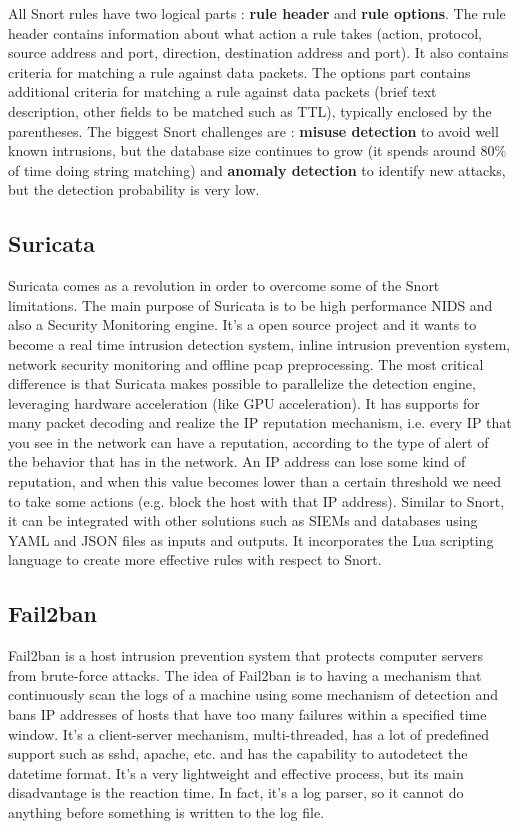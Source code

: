 \documentclass[11pt]{article}
\begin{document}
All Snort rules have two logical parts : \textbf{rule header} and \textbf{rule options}. The rule header contains information about what action a rule takes (action, protocol, source address and port, direction, destination address and port). It also contains criteria for matching a rule against data packets. The options part contains additional criteria for matching a rule against data packets (brief text description, other fields to be matched such as TTL), typically enclosed by the parentheses. The biggest Snort challenges are : \textbf{misuse detection} to avoid well known intrusions, but the database size continues to grow (it spends around $80\%$ of time doing string matching) and \textbf{anomaly detection} to identify new attacks, but the detection probability is very low.
\subsection{Suricata}
Suricata comes as a revolution in order to overcome some of the Snort limitations. The main purpose of Suricata is to be high performance NIDS and also a Security Monitoring engine. It's a open source project and it wants to become a real time intrusion detection system, inline intrusion prevention system, network security monitoring and offline pcap preprocessing. The most critical difference is that Suricata makes
possible to parallelize the detection engine, leveraging hardware acceleration (like GPU acceleration). It has supports for many packet decoding and realize the IP reputation mechanism, i.e. every IP that you see in the network can have a reputation, according to the type of alert of the behavior that has in the network. An IP address can lose some kind of reputation, and when this value becomes lower than a certain threshold we need to take some actions (e.g. block the host with that IP address). Similar to Snort, it can be integrated with other solutions such as SIEMs and databases using YAML and JSON files as inputs and outputs. It incorporates the Lua scripting language to create more effective rules with respect to Snort.
\subsection{Fail2ban}
Fail2ban is a host intrusion prevention system that protects computer servers from brute-force attacks. The idea of Fail2ban is to having a mechanism that continuously scan the logs of a machine using some mechanism of detection and bans IP addresses of hosts that have too many failures within a specified time window. It's a client-server mechanism, multi-threaded, has a lot of predefined support such as sshd, apache, etc. and has the capability to autodetect the datetime format. It's a very lightweight and effective process, but its main disadvantage is the reaction time. In fact, it's a log parser, so it cannot do anything before something is written to the log file.
\end{document}
